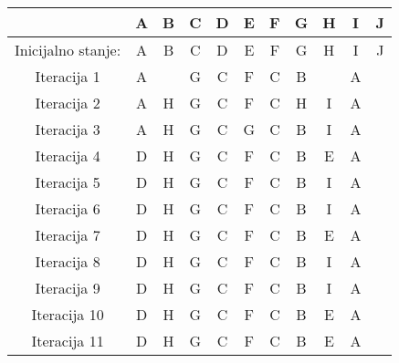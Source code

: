 \documentclass[12pt]{article}
\begin{document}
\begin{tabular}{ | c || c  | c | c | c | c | c | c | c | c | c | }
\hline
 & A & B & C & D & E & F & G & H & I & J\\
 \hline
 \hline
Inicijalno stanje:  & A & B & C & D & E & F & G & H & I & J\\
 \hline
Iteracija 1 & A &  & G & C & F & C & B &  & A & \\
 \hline
Iteracija 2 & A & H & G & C & F & C & H & I & A & \\
 \hline
Iteracija 3 & A & H & G & C & G & C & B & I & A & \\
 \hline
Iteracija 4 & D & H & G & C & F & C & B & E & A & \\
 \hline
Iteracija 5 & D & H & G & C & F & C & B & I & A & \\
 \hline
Iteracija 6 & D & H & G & C & F & C & B & I & A & \\
 \hline
Iteracija 7 & D & H & G & C & F & C & B & E & A & \\
 \hline
Iteracija 8 & D & H & G & C & F & C & B & I & A & \\
 \hline
Iteracija 9 & D & H & G & C & F & C & B & I & A & \\
 \hline
Iteracija 10 & D & H & G & C & F & C & B & E & A & \\
 \hline
Iteracija 11 & D & H & G & C & F & C & B & E & A & \\
 \hline
\end{tabular}
\end{document}
